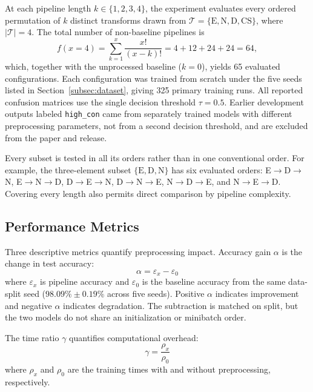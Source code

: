 \documentclass[preprint,review,12pt]{elsarticle}
\begin{document}
At each pipeline length $k \in \{1, 2, 3, 4\}$, the experiment evaluates every ordered permutation of $k$ distinct transforms drawn from $\mathcal{T} = \{\text{E}, \text{N}, \text{D}, \text{CS}\}$, where $|\mathcal{T}| = 4$. The total number of non-baseline pipelines is
\begin{equation}
f(x=4) = \sum_{k=1}^{x} \frac{x!}{(x - k)!} = 4 + 12 + 24 + 24 = 64,
\label{eq:combinatorics}
\end{equation}
which, together with the unprocessed baseline ($k=0$), yields 65 evaluated configurations. Each configuration was trained from scratch under the five seeds listed in Section~\ref{subsec:dataset}, giving 325 primary training runs. All reported confusion matrices use the single decision threshold $\tau=0.5$. Earlier development outputs labeled \texttt{high\_con} came from separately trained models with different preprocessing parameters, not from a second decision threshold, and are excluded from the paper and release.

Every subset is tested in all its orders rather than in one conventional order. For example, the three-element subset $\{\text{E}, \text{D}, \text{N}\}$ has six evaluated orders: E$\to$D$\to$N, E$\to$N$\to$D, D$\to$E$\to$N, D$\to$N$\to$E, N$\to$D$\to$E, and N$\to$E$\to$D. Covering every length also permits direct comparison by pipeline complexity.

\subsection{Performance Metrics}

Three descriptive metrics quantify preprocessing impact. Accuracy gain $\alpha$ is the change in test accuracy:
\begin{equation}
\alpha = \varepsilon_x - \varepsilon_0
\label{eq:alpha}
\end{equation}
where $\varepsilon_x$ is pipeline accuracy and $\varepsilon_0$ is the baseline accuracy from the same data-split seed ($98.09\%\pm0.19\%$ across five seeds). Positive $\alpha$ indicates improvement and negative $\alpha$ indicates degradation. The subtraction is matched on split, but the two models do not share an initialization or minibatch order.

The time ratio $\gamma$ quantifies computational overhead:
\begin{equation}
\gamma = \frac{\rho_x}{\rho_0}
\label{eq:gamma}
\end{equation}
where $\rho_x$ and $\rho_0$ are the training times with and without preprocessing, respectively.
\end{document}
